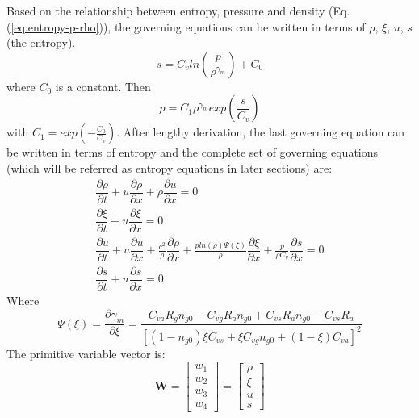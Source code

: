 Based on the relationship between entropy, pressure and density (Eq. (\ref{eq:entropy-p-rho})), the governing equations can be written in terms of $\rho$, $\xi$, $u$, $s$ (the entropy).
\begin{equation}
s=C_v ln(\dfrac{p}{\rho^{\gamma_m}})+C_0 \label{eq:entropy-p-rho}
\end{equation}
where $C_0$ is a constant. Then
\begin{equation}
p=C_1 \rho^{\gamma_m} exp(\frac{s}{C_v})
\end{equation}
with $C_1=exp(-\frac{C_0}{C_v})$.
After lengthy derivation, the last governing equation can be written in terms of entropy and the complete set of governing equations (which will be referred as entropy equations in later sections) are: 
\begin{eqnarray}
\dfrac{\partial \rho}{\partial t} + u \dfrac{\partial \rho} {\partial x} + \rho \dfrac{\partial u} {\partial x}= 0 \label{eq:gov-EntropyForm-rho-1d-hom} \\
\dfrac{\partial \xi}{\partial t} + u \dfrac{\partial \xi} {\partial x}= 0 \label{eq:gov-EntropyForm-ks-1d-hom}\\
\dfrac{\partial u}{\partial t} + u \dfrac{\partial u} {\partial x} + \frac{c^2}{\rho} \dfrac{\partial \rho} {\partial x} + \frac{p ln(\rho) \Psi(\xi)}{\rho} \dfrac{\partial \xi} {\partial x} + \frac{p}{\rho C_v} \dfrac{\partial s} {\partial x} = 0 \label{eq:gov-EntropyForm-v-1d-hom} \\
\dfrac{\partial s}{\partial t} + u \dfrac{\partial s} {\partial x}= 0 \label{eq:gov-EntropyForm-e-1d-hom}
\end{eqnarray}
Where
\begin{equation}
\Psi(\xi) = \dfrac{\partial \gamma_m}{ \partial \xi}
= \frac{C_{va}R_g n_{g0} - C_{vg}R_a n_{g0} + C_{vs}R_a n_{g0} - C_{vs} R_a}{\left[(1-n_{g0}) \xi C_{vs} + \xi C_{vg} n_{g0}+(1-\xi)C_{va}\right]^2}
\end{equation}
The primitive variable vector is:
\begin{equation}
   \textbf{W}=\begin{bmatrix}
         w_1 \\
         w_2 \\
         w_3 \\
         w_4
     \end{bmatrix}
    =\begin{bmatrix}
         \rho \\
         \xi \\
         u   \\
         s
     \end{bmatrix}
\end{equation}

